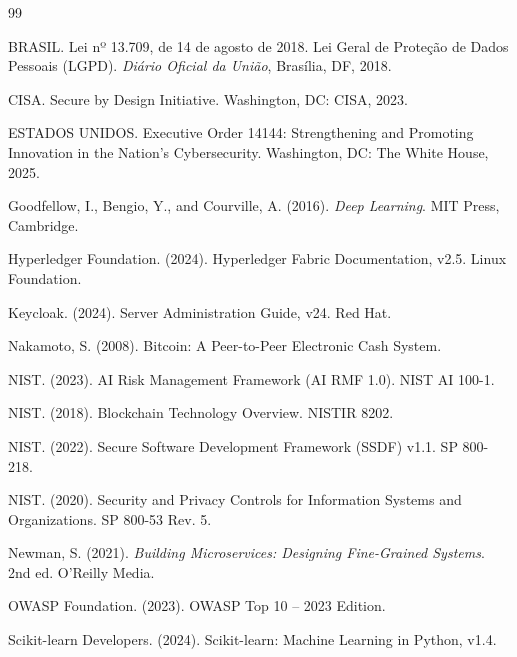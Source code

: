\documentclass[12pt]{article}
\begin{document}
\begin{thebibliography}{99}

BRASIL. Lei nº 13.709, de 14 de agosto de 2018. Lei Geral de Proteção de Dados Pessoais (LGPD). \textit{Diário Oficial da União}, Brasília, DF, 2018.

CISA. Secure by Design Initiative. Washington, DC: CISA, 2023.

ESTADOS UNIDOS. Executive Order 14144: Strengthening and Promoting Innovation in the Nation's Cybersecurity. Washington, DC: The White House, 2025.

Goodfellow, I., Bengio, Y., and Courville, A. (2016). \textit{Deep Learning}. MIT Press, Cambridge.

Hyperledger Foundation. (2024). Hyperledger Fabric Documentation, v2.5. Linux Foundation.

Keycloak. (2024). Server Administration Guide, v24. Red Hat.

Nakamoto, S. (2008). Bitcoin: A Peer-to-Peer Electronic Cash System.

NIST. (2023). AI Risk Management Framework (AI RMF 1.0). NIST AI 100-1.

NIST. (2018). Blockchain Technology Overview. NISTIR 8202.

NIST. (2022). Secure Software Development Framework (SSDF) v1.1. SP 800-218.

NIST. (2020). Security and Privacy Controls for Information Systems and Organizations. SP 800-53 Rev. 5.

Newman, S. (2021). \textit{Building Microservices: Designing Fine-Grained Systems}. 2nd ed. O'Reilly Media.

OWASP Foundation. (2023). OWASP Top 10 -- 2023 Edition.

Scikit-learn Developers. (2024). Scikit-learn: Machine Learning in Python, v1.4.

\end{thebibliography}
\end{document}

